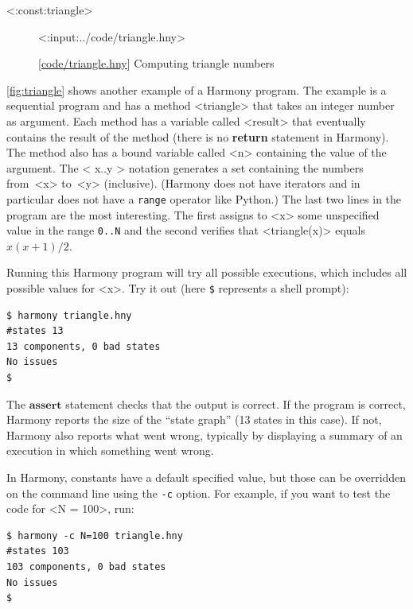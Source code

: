 \documentclass{report}
\newcommand{\harmonylink}[1]{%
[\href{https://harmony.cs.cornell.edu/#1}{\underline{#1}}]%
}
\newenvironment{code}{
\tcolorbox
}{
\endtcolorbox
}
\begin{document}
<{:const:triangle}>

\begin{figure}
\begin{code}
<{:input:../code/triangle.hny}>
\end{code}
\caption{\harmonylink{code/triangle.hny} Computing triangle numbers}
\label{fig:triangle}
\end{figure}

\autoref{fig:triangle} shows another example of a Harmony program.
The example is a sequential program
and has a method <{triangle}> that takes
an integer number as argument.  Each method has a variable called
<{result}> that eventually contains the result of the
method (there is no \textbf{return} statement in Harmony).  The method
also has a bound variable called <{n}> containing the value of the
argument.  The <{{ x..y }}> notation generates a set containing the numbers
from~<{x}> to~<{y}> (inclusive).
(Harmony does not have iterators and in particular does
not have a \texttt{range} operator like Python.)
The last two lines in the program are
the most interesting.
The first assigns to <{x}> some unspecified value in the range \texttt{0..N}
and the second verifies that <{triangle(x)}> equals $x(x+1)/2$.

Running this Harmony program will try all possible executions, which
includes all possible values for <{x}>.  Try it out (here \texttt{\$}
represents a shell prompt):

\begin{code}
\begin{verbatim}
$ harmony triangle.hny
#states 13
13 components, 0 bad states
No issues
$
\end{verbatim}
\end{code}

The $\textbf{assert}$ statement checks that the output is
correct.  If the program is correct, Harmony reports the size of the
``state graph'' (13 states in this case).  If not, Harmony also
reports what went wrong, typically by displaying a summary of an execution in
which something went wrong.

In Harmony, constants have a default specified value,
but those can be overridden on the command
line using the \texttt{-c} option.
%
For example, if you want to test the code for <{N = 100}>, run:
\begin{code}
\begin{verbatim}
$ harmony -c N=100 triangle.hny
#states 103
103 components, 0 bad states
No issues
$
\end{verbatim}
\end{code}
\end{document}
